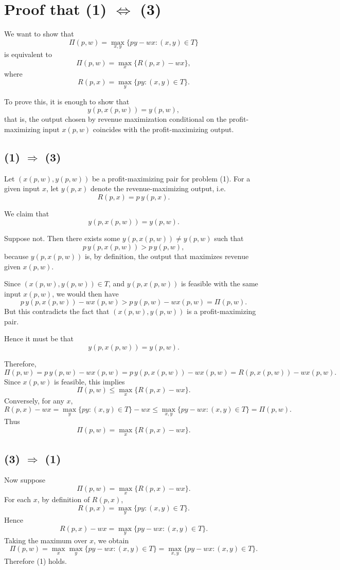 \section*{Proof that (1) $\iff$ (3)}

We want to show that
\[
\Pi(p,w)=\max_{x,y}\{py-wx:(x,y)\in T\}
\]
is equivalent to
\[
\Pi(p,w)=\max_x\{R(p,x)-wx\},
\]
where
\[
R(p,x)=\max_y\{py:(x,y)\in T\}.
\]

To prove this, it is enough to show that
\[
y(p,x(p,w))=y(p,w),
\]
that is, the output chosen by revenue maximization conditional on the profit-maximizing input \(x(p,w)\) coincides with the profit-maximizing output.

\subsection*{(1) $\Rightarrow$ (3)}

Let \((x(p,w),y(p,w))\) be a profit-maximizing pair for problem (1).  
For a given input \(x\), let \(y(p,x)\) denote the revenue-maximizing output, i.e.
\[
R(p,x)=p\,y(p,x).
\]

We claim that
\[
y(p,x(p,w))=y(p,w).
\]

Suppose not. Then there exists some \(y(p,x(p,w))\neq y(p,w)\) such that
\[
p\,y(p,x(p,w))>p\,y(p,w),
\]
because \(y(p,x(p,w))\) is, by definition, the output that maximizes revenue given \(x(p,w)\).

Since \((x(p,w),y(p,w))\in T\), and \(y(p,x(p,w))\) is feasible with the same input \(x(p,w)\), we would then have
\[
p\,y(p,x(p,w))-w x(p,w)
>
p\,y(p,w)-w x(p,w)
=
\Pi(p,w).
\]
But this contradicts the fact that \((x(p,w),y(p,w))\) is a profit-maximizing pair.

Hence it must be that
\[
y(p,x(p,w))=y(p,w).
\]

Therefore,
\[
\Pi(p,w)
=
p\,y(p,w)-w x(p,w)
=
p\,y(p,x(p,w))-w x(p,w)
=
R(p,x(p,w))-w x(p,w).
\]
Since \(x(p,w)\) is feasible, this implies
\[
\Pi(p,w)\le \max_x\{R(p,x)-wx\}.
\]
Conversely, for any \(x\),
\[
R(p,x)-wx
=
\max_y\{py:(x,y)\in T\}-wx
\le
\max_{x,y}\{py-wx:(x,y)\in T\}
=
\Pi(p,w).
\]
Thus
\[
\Pi(p,w)=\max_x\{R(p,x)-wx\}.
\]

\subsection*{(3) $\Rightarrow$ (1)}

Now suppose
\[
\Pi(p,w)=\max_x\{R(p,x)-wx\}.
\]
For each \(x\), by definition of \(R(p,x)\),
\[
R(p,x)=\max_y\{py:(x,y)\in T\}.
\]
Hence
\[
R(p,x)-wx
=
\max_y\{py-wx:(x,y)\in T\}.
\]
Taking the maximum over \(x\), we obtain
\[
\Pi(p,w)
=
\max_x\max_y\{py-wx:(x,y)\in T\}
=
\max_{x,y}\{py-wx:(x,y)\in T\}.
\]
Therefore (1) holds.

